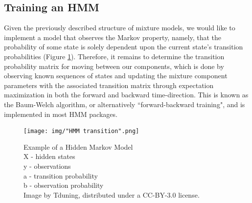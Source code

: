 \documentclass[twocolumn,10pt]{article}
\begin{document}


\subsection{Training an HMM}

Given the previously described structure of mixture models, we would like to implement a model that observes the Markov property, namely, that the probability of some state is solely dependent upon the current state's transition probabilities (Figure \ref{fig:HMM exmaple}). Therefore, it remains to determine the transition probability matrix for moving between our components, which is done by observing known sequences of states and updating the mixture component parameters with the associated transition matrix through expectation maximization in both the forward and backward time-direction. This is known as the Baum-Welch algorithm, or alternatively ``forward-backward training", and is implemented in most HMM packages.~\citep{baum-welch}

\begin{figure}
    \centering
    \texttt{[image: img/"HMM transition".png]}
    \caption{Example of a Hidden Markov Model \\
    \centering X -  hidden states \\
        y - observations \\
        a - transition probability \\
        b - observation probability\\
        \tiny{Image by Tduning, distributed under a CC-BY-3.0 license.}}
    \label{fig:HMM exmaple}
\end{figure}


\end{document}
